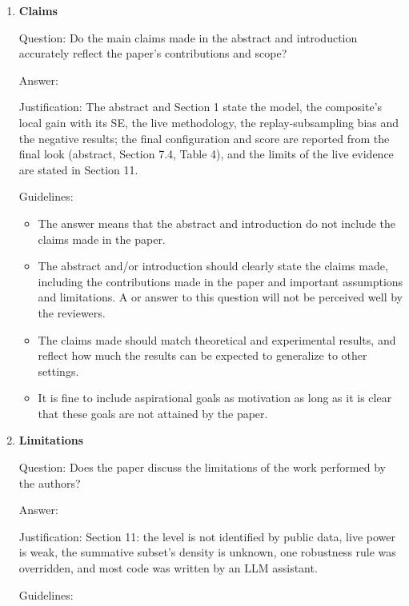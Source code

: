 \documentclass[
]{article}
\begin{document}
\begin{enumerate}
\def\labelenumi{\arabic{enumi}.}
\item
  \textbf{Claims}

  Question: Do the main claims made in the abstract and introduction
  accurately reflect the paper's contributions and scope?

  Answer: \answerYes{}

  Justification: The abstract and Section 1 state the model, the
  composite's local gain with its SE, the live methodology, the
  replay-subsampling bias and the negative results; the final
  configuration and score are reported from the final look (abstract,
  Section 7.4, Table 4), and the limits of the live evidence are stated
  in Section 11.

  Guidelines:

  \begin{itemize}
  \item
    The answer \answerNA{} means that the abstract and introduction do
    not include the claims made in the paper.
  \item
    The abstract and/or introduction should clearly state the claims
    made, including the contributions made in the paper and important
    assumptions and limitations. A \answerNo{} or \answerNA{} answer to
    this question will not be perceived well by the reviewers.
  \item
    The claims made should match theoretical and experimental results,
    and reflect how much the results can be expected to generalize to
    other settings.
  \item
    It is fine to include aspirational goals as motivation as long as it
    is clear that these goals are not attained by the paper.
  \end{itemize}
\item
  \textbf{Limitations}

  Question: Does the paper discuss the limitations of the work performed
  by the authors?

  Answer: \answerYes{}

  Justification: Section 11: the level is not identified by public data,
  live power is weak, the summative subset's density is unknown, one
  robustness rule was overridden, and most code was written by an LLM
  assistant.

  Guidelines:


\end{enumerate}
\end{document}
